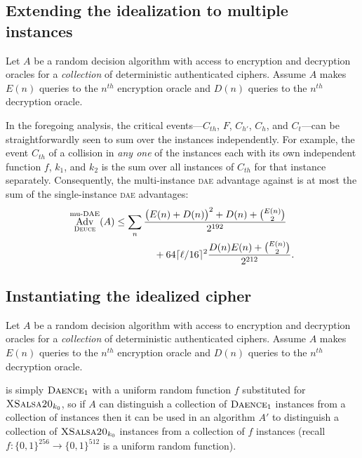 \documentclass{article}
\def\operatorsc#1{{%
  \ifmmode\let\next=\operatorname\else\let\next=\relax\fi\next{\textsc{#1}}}}
\def\XSalsa#1/{\operatorsc{XSalsa#1}}
\def\DAENCE/{\operatorsc{Daence}}
\def\DEUCE/{\operatorsc{Deuce}}
\def\DAE{%
  \ifmmode\def\next{\operatorname{DAE}}%
    \else\def\next/{\textsc{dae}}%
  \fi\next}
\def\muDAE{%
  \ifmmode\def\next{\operatorname{mu-DAE}}%
    \else\def\next/{mu-\textsc{dae}}%
  \fi\next}
\DeclareMathOperator{\Adv}{Adv}
\begin{document}
\subsection{Extending the idealization to multiple instances}

Let $A$ be a random decision algorithm with access to encryption and
 decryption oracles for a \emph{collection} of deterministic
 authenticated ciphers.
Assume $A$ makes $E(n)$ queries to the $n^{\mathit{th}}$ encryption
 oracle and $D(n)$ queries to the $n^{\mathit{th}}$ decryption oracle.

In the foregoing analysis, the critical events---$C_{th}$, $F$,
 $C_{h'}$, $C_h$, and $C_t$---can be straightforwardly seen to sum
 over the instances independently.
For example, the event $C_{th}$ of a collision in \emph{any one} of
 the instances each with its own independent function $f$, $k_1$, and
 $k_2$ is the sum over all instances of $C_{th}$ for that instance
 separately.
Consequently, the multi-instance \DAE/ advantage against \DEUCE/ is at
 most the sum of the single-instance \DAE/ advantages:
%
\begin{align*}
  \Adv^{\muDAE}_{\DEUCE/}(A)
  &\leq \sum_n \frac{\bigl(E(n) + D(n)\bigr)^2 + D(n) + \binom{E(n)}{2}}
                    {2^{192}} \\
  &\qquad\qquad
          + 64\lceil\ell/16\rceil^2
            \frac{D(n) E(n) + \binom{E(n)}{2}}{2^{212}}.
\end{align*}

\subsection{Instantiating the idealized cipher}

Let $A$ be a random decision algorithm with access to encryption and
 decryption oracles for a \emph{collection} of deterministic
 authenticated ciphers.
Assume $A$ makes $E(n)$ queries to the $n^{\mathit{th}}$ encryption
 oracle and $D(n)$ queries to the $n^{\mathit{th}}$ decryption oracle.

\DEUCE/ is simply $\DAENCE/_1$ with a uniform random function $f$
 substituted for $\XSalsa20/_{k_0}$, so if $A$ can distinguish a
 collection of $\DAENCE/_1$ instances from a collection of \DEUCE/
 instances then it can be used in an algorithm $A'$ to distinguish
 a collection of $\XSalsa20/_{k_0}$ instances from a collection of $f$
 instances (recall $f\colon \{0,1\}^{256} \to \{0,1\}^{512}$ is a
 uniform random function).
\end{document}
